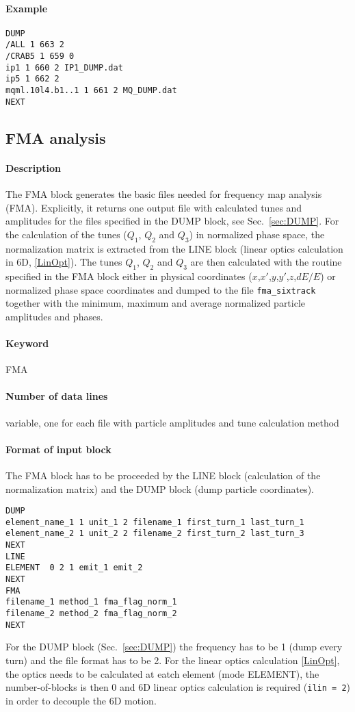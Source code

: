 \documentclass[a4paper,11pt]{report}
\begin{document}
\paragraph{Example}
\begin{verbatim}
DUMP
/ALL 1 663 2
/CRAB5 1 659 0
ip1 1 660 2 IP1_DUMP.dat
ip5 1 662 2
mqml.10l4.b1..1 1 661 2 MQ_DUMP.dat
NEXT
\end{verbatim}

\subsection{FMA analysis} \label{sec:FMA}

\paragraph{Description}
The FMA block generates the basic files needed for frequency map analysis (FMA). Explicitly, it returns one output file with calculated tunes and amplitudes for the files specified in the DUMP block, see Sec.~\ref{sec:DUMP}. For the calculation of the tunes ($Q_1$, $Q_2$ and $Q_3$) in normalized phase space, the normalization matrix is extracted from the LINE block (linear optics calculation in 6D, \ref{LinOpt}). The tunes $Q_1$, $Q_2$ and $Q_3$ are then calculated with the routine specified in the FMA block either in physical coordinates ($x$,$x'$,$y$,$y'$,$z$,$dE/E$) or normalized phase space coordinates and dumped to the file \verb|fma_sixtrack| together with the minimum, maximum and average normalized particle amplitudes and phases. 

\paragraph{Keyword}
FMA

\paragraph{Number of data lines}
variable, one for each file with particle amplitudes and tune calculation method

\paragraph{Format of input block}
The FMA block has to be proceeded by the LINE block (calculation of the normalization matrix) and the DUMP block (dump particle coordinates).
\begin{verbatim}
DUMP
element_name_1 1 unit_1 2 filename_1 first_turn_1 last_turn_1
element_name_2 1 unit_2 2 filename_2 first_turn_2 last_turn_3
NEXT
LINE
ELEMENT  0 2 1 emit_1 emit_2
NEXT
FMA
filename_1 method_1 fma_flag_norm_1
filename_2 method_2 fma_flag_norm_2
NEXT
\end{verbatim}
For the DUMP block (Sec.~\ref{sec:DUMP}) the frequency has to be 1 (dump every turn) and the file format has to be 2. For the linear optics calculation \ref{LinOpt}, the optics needs to be calculated at eatch element (mode ELEMENT), the number-of-blocks is then 0 and 6D linear optics calculation is required (\verb|ilin = 2|) in order to decouple the 6D motion. 
\end{document}
